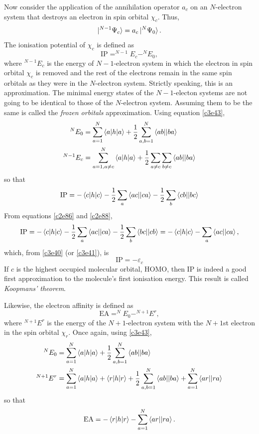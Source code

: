 Now consider the application of the annihilation operator $a_c$ on an
$N$-electron system that destroys an electron in spin orbital $\chi_c$. Thus,
\begin{equation}\label{c3e44}
\ket{^{N-1}\Psi_c} = a_c\ket{^N\Psi_0}.
\end{equation}
The ionisation potential of $\chi_c$ is defined as
\begin{equation}\label{c3e45}
\text{IP} = ^{N-1}E_c - ^{N}E_0,
\end{equation}
where $^{N-1}E_c$ is the energy of $N-1$-electron system in which the electron
in spin orbital $\chi_c$ is removed and the rest of the electrons remain in the
same spin orbitals as they were in the $N$-electron system. Strictly speaking,
this is an approximation. The minimal energy states of the $N-1$-electon systems
are not going to be identical to those of the $N$-electron system. Assuming them
to be the same is called the \emph{frozen orbitals} approximation. Using
equation \eqref{c3e43},
\[
\begin{aligned}
^NE_0 &= \sum_{a=1}^N\braket{a|h|a} + \frac{1}{2}\sum_{a,b=1}^N\braket{ab||ba} \\
^{N-1}E_c &= \sum_{a=1, a\ne c}^N\braket{a|h|a} +
\frac{1}{2}\sum_{a\ne c}\sum_{b \ne c}\braket{ab||ba}
\end{aligned}
\]
so that
\[
\text{IP} = -\braket{c|h|c} - \frac{1}{2}\sum_a\braket{ac||ca} - \frac{1}{2}\sum_b
\braket{cb||bc}
\]
From equations \eqref{c2e86} and \eqref{c2e88},
\[
\text{IP} = -\braket{c|h|c} - \frac{1}{2}\sum_a\braket{ac||ca} - \frac{1}{2}\sum_b
\braket{bc||cb} = -\braket{c|h|c} - \sum_a\braket{ac||ca},
\]
which, from \eqref{c3e40} (or \eqref{c3e41}), is
\begin{equation}\label{c3e46}
\text{IP} = -\varepsilon_c
\end{equation}
If $c$ is the highest occupied molecular orbital, HOMO, then $\text{IP}$ is indeed a
good first approximation to the molecule's first ionisation energy. This result
is called \emph{Koopmans' theorem}.

Likewise, the electron affinity is defined as 
\begin{equation}\label{c3e47}
\text{EA} = ^NE_0 - ^{N+1}E^r,
\end{equation}
where $^{N+1}E^r$ is the energy of the $N+1$-electron system with the $N+1$st
electron in the spin orbital $\chi_r$. Once again, using \eqref{c3e43},
\[
\begin{aligned}
^NE_0 &= \sum_{a=1}^N\braket{a|h|a} + \frac{1}{2}\sum_{a,b=1}^N\braket{ab||ba}
\\
^{N+1}E^r &= \sum_{a=1}^N\braket{a|h|a} + \braket{r|h|r} + \frac{1}{2}
\sum_{a,b=1}^N\braket{ab||ba} + \sum_{a=1}^N\braket{ar||ra}
\end{aligned}
\]
so that
\begin{equation}\label{c3e48}
\text{EA} = -\braket{r|h|r} - \sum_{a=1}^N\braket{ar||ra}.
\end{equation}

